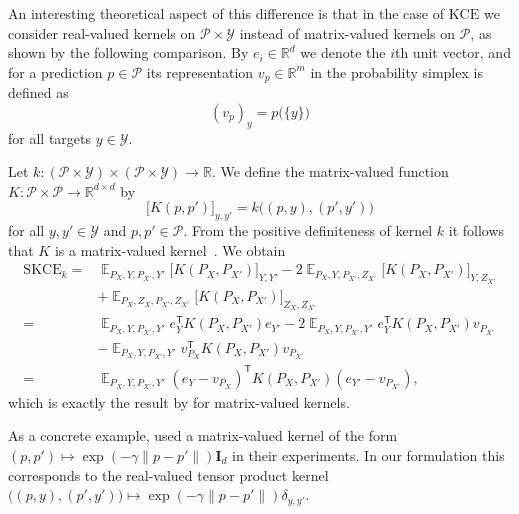 \documentclass{article}
\DeclareMathOperator{\Exp}{\mathbb{E}}
\begin{document}
An interesting theoretical aspect of this difference is that
in the case of $\mathrm{KCE}$ we consider real-valued kernels on
$\mathcal{P} \times \mathcal{Y}$ instead of
matrix-valued kernels on $\mathcal{P}$, as shown by the following
comparison. By $e_i \in \mathbb{R}^d$ we denote the $i$th unit vector,
and for a prediction $p \in \mathcal{P}$ its representation
$v_p \in \mathbb{R}^m$ in the probability simplex is defined as
\begin{equation*}
    {(v_p)}_y = p\big(\{y\}\big)
\end{equation*}
for all targets $y \in \mathcal{Y}$.

Let $k \colon (\mathcal{P} \times \mathcal{Y}) \times (\mathcal{P} \times \mathcal{Y}) \to \mathbb{R}$.
We define the matrix-valued function
$K \colon \mathcal{P} \times \mathcal{P} \to \mathbb{R}^{d \times d}$
by
\begin{equation*}
    \big[K(p, p')\big]_{y,y'} = k\big((p, y), (p', y')\big)
\end{equation*}
for all $y,y' \in \mathcal{Y}$ and $p, p' \in \mathcal{P}$.
From the positive definiteness of kernel $k$ it follows that
$K$ is a matrix-valued kernel~\citep[Definition~2]{Micchelli2005}.
We obtain
\begin{equation*}
    \begin{split}
        \mathrm{SKCE}_{k} ={}& \Exp_{P_X,Y,P_{X'},Y'} \big[K(P_X, P_{X'})\big]_{Y,Y'}
        - 2 \Exp_{P_X,Y,P_{X'},Z_{X'}} \big[K(P_X, P_{X'})\big]_{Y,Z_{X'}} \\
        &+ \Exp_{P_X,Z_X,P_{X'},Z_{X'}} \big[K(P_X, P_{X'})\big]_{Z_X,Z_{X'}} \\
        ={}& \Exp_{P_X,Y,P_{X'},Y'} e_Y^\mathsf{T} K(P_X, P_{X'}) e_{Y'}
        - 2 \Exp_{P_X,Y,P_{X'},Y'} e_Y^\mathsf{T} K(P_X, P_{X'}) v_{P_{X'}} \\
        & - \Exp_{P_X,Y,P_{X'},Y'} v_{P_X}^\mathsf{T} K(P_X, P_{X'}) v_{P_{X'}} \\
        ={}& \Exp_{P_X,Y,P_{X'},Y'}{(e_Y - v_{P_X})}^\mathsf{T} K(P_X, P_{X'}) (e_{Y'} - v_{P_{X'}}),
    \end{split}
\end{equation*}
which is exactly the result by \citet{Widmann2019}
for matrix-valued kernels.

As a concrete example, \citet{Widmann2019} used a
matrix-valued kernel of the form
$(p, p') \mapsto \exp{(- \gamma \|p - p'\|)} \mathbf{I}_d$
in their experiments. In our formulation this corresponds to the
real-valued tensor product kernel
$\big((p, y), (p', y')\big) \mapsto \exp{(- \gamma \|p - p'\|)} \delta_{y,y'}$.
\end{document}

